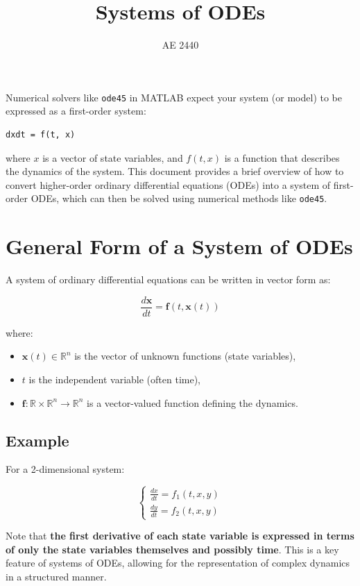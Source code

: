 \documentclass{article}
\begin{document}
\title{Systems of ODEs}
\author{AE 2440}
\date{}
\maketitle


Numerical solvers like \texttt{ode45} in MATLAB expect your system (or model) to be expressed as a first-order system:

\begin{lstlisting}[style=Matlab-editor]
    dxdt = f(t, x)
\end{lstlisting}
where \( x \) is a vector of state variables, and \( f(t, x) \) is a function that describes the dynamics of the system.
This document provides a brief overview of how to convert higher-order ordinary differential equations (ODEs) into a system of first-order ODEs, which can then be solved using numerical methods like \texttt{ode45}.


\section*{General Form of a System of ODEs}

A system of ordinary differential equations can be written in vector form as:

\[
\frac{d\mathbf{x}}{dt} = \mathbf{f}(t, \mathbf{x}(t))
\]

where:
\begin{itemize}
  \item $\mathbf{x}(t) \in \mathbb{R}^n$ is the vector of unknown functions (state variables),
  \item $t$ is the independent variable (often time),
  \item $\mathbf{f}: \mathbb{R} \times \mathbb{R}^n \to \mathbb{R}^n$ is a vector-valued function defining the dynamics.
\end{itemize}

\subsection*{Example}

For a 2-dimensional system:

\[
\begin{cases}
\frac{dx}{dt} = f_1(t, x, y) \\
\frac{dy}{dt} = f_2(t, x, y)
\end{cases}
\]

Note that \textbf{the first derivative of each state variable is expressed in terms of only the state variables themselves and possibly time}. This is a key feature of systems of ODEs, allowing for the representation of complex dynamics in a structured manner.  
\end{document}
